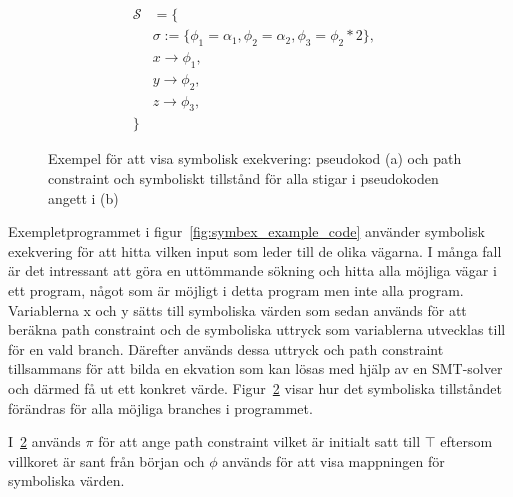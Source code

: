 \begin{figure}[H]
\begin{subfigure}[t]{0.5\textwidth}
    \caption{} %
    \label{fig:symbex_example_graph}
  \end{subfigure}
  \begin{align*}
    \mathcal{S} & = \{ &\\
    &\sigma := \{\phi_1 = \alpha_1, \phi_2 = \alpha_2, \phi_3 = \phi_2 *
    2\},&\\
    &x \rightarrow \phi_1,&\\
    &y \rightarrow \phi_2,&\\
    &z \rightarrow \phi_3,&\\
    \}
  \end{align*}
  \caption{Exempel för att visa symbolisk exekvering: pseudokod (a) och path
  constraint och symboliskt tillstånd för alla stigar i pseudokoden angett i (b)}
\end{figure}

Exempletprogrammet i figur~\ref{fig:symbex_example_code} använder
symbolisk exekvering för att hitta vilken input som leder till de olika
vägarna. I många fall är det intressant att göra en uttömmande
sökning och hitta alla möjliga vägar i ett program, något som är möjligt i detta
program men inte alla program. Variablerna x och y sätts till symboliska värden
som sedan används för att beräkna path constraint och de symboliska uttryck som
variablerna utvecklas till för en vald branch. Därefter används dessa uttryck
och path constraint tillsammans för att bilda en ekvation som kan lösas med
hjälp av en SMT-solver och därmed få ut ett konkret värde.
Figur~\ref{fig:symbex_example_graph} visar hur det symboliska tillståndet
förändras för alla möjliga branches i programmet.

I~\ref{fig:symbex_example_graph} används $\pi$ för att ange path constraint vilket
är initialt satt till $\top$ eftersom villkoret är sant från början och $\phi$
används för att visa mappningen för symboliska värden.

